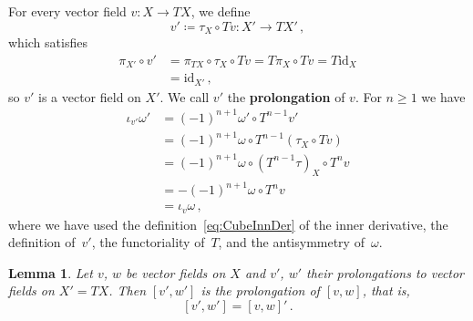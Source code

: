 \documentclass[12pt,reqno, a4paper]{amsart}
\numberwithin{equation}{section}
\theoremstyle{plain}
\newtheorem{Lemma}[Theorem]{Lemma}
\theoremstyle{definition}
\theoremstyle{remark}
\newcommand{\id}{\mathrm{id}}
\begin{document}
For every vector field $v\colon X \to TX$, we define
\begin{equation}
\label{eq:vPrimeDef}
  v' \coloneqq \tau_X \circ Tv
  \colon X' \longrightarrow TX'
  \,,
\end{equation}
which satisfies
\begin{equation*}
\begin{split}
  \pi_{X'} \circ v'
  &=
  \pi_{TX} \circ \tau_X \circ Tv
  =
  T\pi_X \circ Tv
  =
  T\id_X
  \\
  &=
  \id_{X'}
  \,,
\end{split}
\end{equation*}
so $v'$ is a vector field on $X'$. We call $v'$ the \textbf{prolongation} of $v$. For $n \geq 1$ we have
\begin{equation}
\label{eq:InnPrime}
\begin{split}
  \iota_{v'}\omega'
  &= (-1)^{n+1} \omega' \circ T^{n-1} v'
  \\
  &= (-1)^{n+1} \omega \circ
  T^{n-1}(\tau_X \circ Tv)
  \\
  &= (-1)^{n+1} \omega \circ
  (T^{n-1}\tau)_X \circ T^n v
  \\
  &= -(-1)^{n+1} \omega \circ T^n v
  \\
  &= \iota_v\omega
  \,,
\end{split}
\end{equation}
where we have used the definition~\eqref{eq:CubeInnDer} of the inner derivative, the definition of~$v'$, the functoriality of~$T$, and the antisymmetry of~$\omega$.

\begin{Lemma}
\label{lem:ProlongBracket}
Let $v$, $w$ be vector fields on $X$ and $v'$, $w'$ their prolongations to vector fields on $X' = TX$. Then $[v',w']$ is the prolongation of $[v,w]$, that is,
\begin{equation*}
  [v',w'] = [v,w]'
  \,.
\end{equation*}
\end{Lemma}
\end{document}
